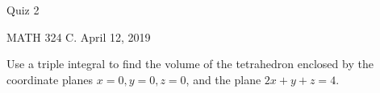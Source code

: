 \documentclass{exam}
\begin{document}
 
\begin{center} \begin{Large} Quiz 2\end{Large}

\vspace{5mm}
MATH 324 C. April 12, 2019
\end{center} 

\vspace{5mm}

\begin{center}
\end{center}

\vspace{1cm}
 

\vspace{1cm}

\begin{questions}
\question Use a triple integral to find the volume of the tetrahedron enclosed by the coordinate planes $x = 0, y = 0, z = 0$, and the plane $2x + y + z = 4$. 

\end{questions}
\end{document}
